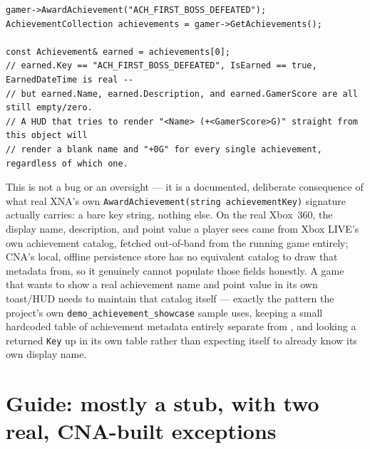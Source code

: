 \begin{lstlisting}
gamer->AwardAchievement("ACH_FIRST_BOSS_DEFEATED");
AchievementCollection achievements = gamer->GetAchievements();

const Achievement& earned = achievements[0];
// earned.Key == "ACH_FIRST_BOSS_DEFEATED", IsEarned == true, EarnedDateTime is real --
// but earned.Name, earned.Description, and earned.GamerScore are all still empty/zero.
// A HUD that tries to render "<Name> (+<GamerScore>G)" straight from this object will
// render a blank name and "+0G" for every single achievement, regardless of which one.
\end{lstlisting}

This is not a bug or an oversight --- it is a documented, deliberate consequence of what real
XNA's own \texttt{AwardAchievement(string achievementKey)} signature actually carries: a bare
key string, nothing else. On the real Xbox~360, the display name, description, and point value
a player sees came from Xbox LIVE's own achievement catalog, fetched out-of-band from the
running game entirely; CNA's local, offline persistence store has no equivalent catalog to draw
that metadata from, so it genuinely cannot populate those fields honestly. A game that wants to
show a real achievement name and point value in its own toast/HUD needs to maintain that
catalog itself --- exactly the pattern the project's own \texttt{demo\_achievement\_showcase}
sample uses, keeping a small hardcoded table of achievement metadata entirely separate from
, and looking a returned \texttt{Key} up in its own table rather than
expecting  itself to already know its own display name.

\section{Guide: mostly a stub, with two real, CNA-built exceptions}

